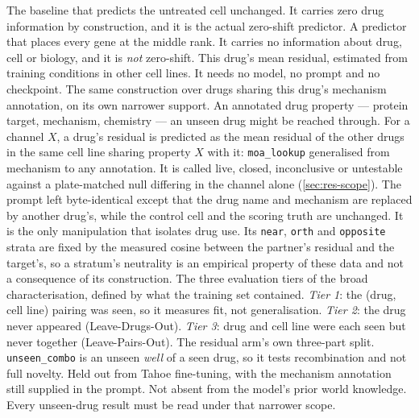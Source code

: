 \begin{description}[leftmargin=1em, itemsep=0.5ex,
                    font=\normalfont\bfseries]
 The baseline that predicts the
  untreated cell unchanged. It carries zero drug information by construction,
  and it is the actual zero-shift predictor.
 A predictor that places every
  gene at the middle rank. It carries no information about drug, cell or
  biology, and it is \emph{not} zero-shift.
 This drug's mean residual, estimated from
  training conditions in other cell lines. It needs no model, no prompt and no
  checkpoint.
 The same construction over drugs
  sharing this drug's mechanism annotation, on its own narrower support.
 An annotated drug property --- protein target,
  mechanism, chemistry --- an unseen drug might be reached through. For a
  channel $X$, a drug's residual is predicted as the mean residual of the other
  drugs in the same cell line sharing property $X$ with it: \texttt{moa\_lookup}
  generalised from mechanism to any annotation. It is called live, closed,
  inconclusive or untestable against a plate-matched null differing in the
  channel alone (\cref{sec:res-scope}).
 The prompt left byte-identical except that the
  drug name and mechanism are replaced by another drug's, while the control cell
  and the scoring truth are unchanged. It is the only manipulation that isolates
  drug use. Its \texttt{near}, \texttt{orth} and \texttt{opposite} strata are
  fixed by the measured cosine between the partner's residual and the target's,
  so a stratum's neutrality is an empirical property of these data and not a
  consequence of its construction.
 The three evaluation tiers of the broad
  characterisation, defined by what the training set contained. \emph{Tier 1}:
  the (drug, cell line) pairing was seen, so it measures fit, not
  generalisation. \emph{Tier 2}: the drug never appeared (Leave-Drugs-Out).
  \emph{Tier 3}: drug and cell line were each seen but never together
  (Leave-Pairs-Out).
 The residual arm's own three-part split.
  \texttt{unseen\_}\allowbreak\texttt{combo} is an unseen \emph{well} of a seen
  drug, so it tests
  recombination and not full novelty.
 Held out from Tahoe fine-tuning, with the mechanism
  annotation still supplied in the prompt. Not absent from the model's prior
  world knowledge. Every unseen-drug result must be read under that narrower
  scope.
\end{description}

